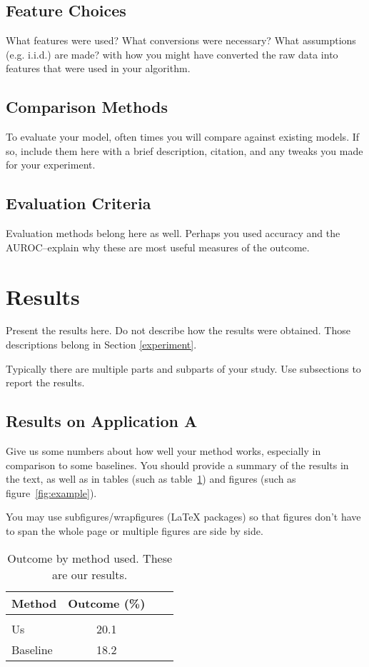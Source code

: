 \documentclass[twoside,11pt]{article}
\begin{document}
\subsection{Feature Choices} 
What features were used? What conversions were necessary? What assumptions (e.g. i.i.d.) are made? with how you might have converted the raw data into features that were used in your algorithm. 

\subsection{Comparison Methods}
To evaluate your model, often times you will compare against existing models.
If so, include them here with a brief description, citation, and any tweaks you made for your experiment.

\subsection{Evaluation Criteria}
Evaluation methods belong here as well.
Perhaps you used accuracy and the AUROC--explain why these are most useful measures of the outcome.

\section{Results} \label{results}

Present the results here.
Do not describe how the results were obtained.
Those descriptions belong in Section \ref{experiment}.

Typically there are multiple parts and subparts of your study.
Use subsections to report the results.

\subsection{Results on Application A} 

Give us some numbers about how well your method works, especially in comparison to some baselines.
You should provide a summary of the results in the text, as well as in tables (such as table~\ref{tab:example}) and figures (such as figure~\ref{fig:example}).  

You may use subfigures/wrapfigures (LaTeX packages) so that figures don't have to span the whole page or multiple figures are side by side.

\begin{table}[htbp]
  \centering 
  \begin{tabular}{lclc} 
    Method & Outcome (\%) \\ 
    \hline \\[-11pt]
    Us & 20.1 \\ 
    Baseline & 18.2 \\ \hline 
  \end{tabular}
  \label{tab:example} 
    \caption{Outcome by method used. These are our results.} 
\end{table}
\end{document}
